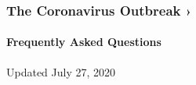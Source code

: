 \href{https://www.nytimes3xbfgragh.onion/news-event/coronavirus?action=click\&pgtype=Article\&state=default\&region=MAIN_CONTENT_3\&context=storylines_faq}{}

\hypertarget{the-coronavirus-outbreak-}{%
\subsubsection{The Coronavirus Outbreak
›}\label{the-coronavirus-outbreak-}}

\hypertarget{frequently-asked-questions}{%
\paragraph{Frequently Asked
Questions}\label{frequently-asked-questions}}

Updated July 27, 2020

